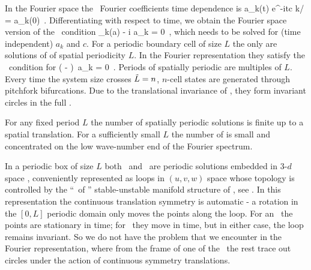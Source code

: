 %

In the Fourier space the \reqva\ Fourier coefficients time
dependence is 
\beq
 a_k(t) e^{-itc k/\tildeL} = a_k(0)
\,.
Differentiating with respect to time, we obtain
the Fourier space version of the \reqv\ condition
\beq
 \pVeloc_k(a) - i  a_k = 0
\,,
which needs to be solved for (time independent) $a_k$ and $c$.
For a periodic boundary cell of size
$L$ the only {\eqva}  are
solutions of  of spatial periodicity $L$.
In the Fourier representation they satisfy
the \eqv\ condition for 
\beq
\left(  -   \right)\, a_k
  = 0
\,.
\label{eq:stfks}
\eeq
Periods of spatially periodic {\eqva} are multiples of $L$.
Every time the system size crosses  $\tilde{L}=n$,
$n$-cell states
are generated through pitchfork bifurcations.
Due to the translational invariance of {\KSe},
they form invariant circles
in the full \statesp.

For any fixed period $L$ the number
of spatially periodic solutions is finite up to a spatial translation.
For a sufficiently small $L$
the number of {\eqva} is small and
concentrated on the low wave-number end of the Fourier spectrum.

In a periodic box of size $L$
both \eqva\ and \reqva\ are  periodic solutions
embedded in 3-$d$ space ,
conveniently represented as loops in
$(u,v,w)$ space whose topology is controlled by the
``\eqva\ of \eqva'' stable-unstable manifold structure of
, see .
In this representation the continuous translation symmetry
is automatic - a rotation in the $[0,L]$ periodic domain only
moves the points along the loop. For an \eqv\ the points
are stationary in time; for \reqv\ they move in time, but in
either case, the loop remains invariant.
So we do not have the problem that we encounter in the Fourier
representation, where from the frame of one of the \eqva\
the rest trace out circles under the action of continuous symmetry
translations.

